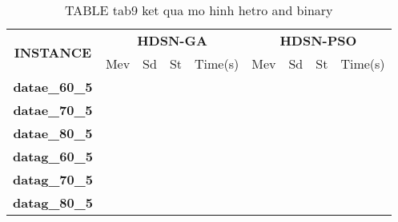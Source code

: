 \begin{table}{}
	\caption{TABLE tab9 ket qua mo hinh hetro and binary}
	\label{tab9}
	\centering
	\begin{tabular}{|c|c|c|c|c|c|c|c|c|}
		\hline
		\multirow{2}{*}{\textbf{INSTANCE}} & \multicolumn{4}{|c}{\textbf{HDSN-GA}} & \multicolumn{4}{|c|}{\textbf{HDSN-PSO}} \\ \cline{2-9}
		& Mev & Sd & St & Time(s) & Mev & Sd & St & Time(s) \\ \hline
		\textbf{datae\_60\_5} & & & & & & & & \\ \hline
		\textbf{datae\_70\_5} & & & & & & & & \\ \hline
		\textbf{datae\_80\_5} & & & & & & & & \\ \hline
		\textbf{datag\_60\_5} & & & & & & & & \\ \hline
		\textbf{datag\_70\_5} & & & & & & & & \\ \hline
		\textbf{datag\_80\_5} & & & & & & & & \\ \hline
	\end{tabular}
\end{table}
